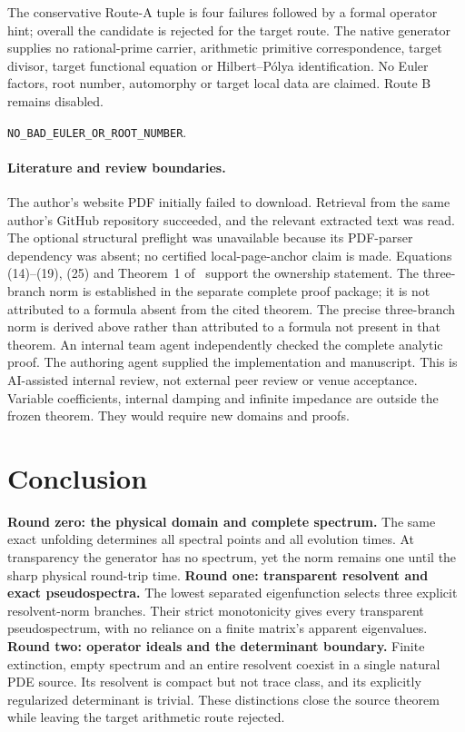 \documentclass[10pt]{article}
\begin{document}
\begin{samepage}
The conservative Route-A tuple is four failures followed by a formal
operator hint; overall the candidate is rejected for the target route.
The native generator supplies no rational-prime carrier, arithmetic
primitive correspondence, target divisor, target functional equation or
Hilbert--P\'olya identification. No Euler factors, root number, automorphy
or target local data are claimed. Route B remains disabled.
\par\noindent\texttt{NO\_BAD\_EULER\_OR\_ROOT\_NUMBER}.
\end{samepage}

\paragraph{Literature and review boundaries.}
The author's website PDF initially failed to download. Retrieval from the
same author's GitHub repository succeeded, and the relevant extracted text
was read. The optional structural preflight was unavailable because its
PDF-parser dependency was absent; no certified local-page-anchor claim is
made. Equations (14)--(19), (25) and Theorem~1 of~\cite{driscoll1996}
support the ownership statement.
\ifnum{}
The three-branch norm is established in the separate complete proof package;
it is not attributed to a formula absent from the cited theorem.
\else
The precise three-branch norm is derived above rather than attributed to a
formula not present in that theorem.
\fi
An internal team agent independently checked the complete analytic proof.
The authoring agent supplied the implementation and manuscript. This is
AI-assisted internal review, not external peer review or venue acceptance.
Variable coefficients, internal damping and infinite impedance are outside
the frozen theorem. They would require new domains and proofs.

\section{Conclusion}
\ifcase\CRevisionRound
\textbf{Round zero: the physical domain and complete spectrum.}
The same exact unfolding determines all spectral points and all evolution
times. At transparency the generator has no spectrum, yet the norm remains
one until the sharp physical round-trip time.
\or
\textbf{Round one: transparent resolvent and exact pseudospectra.}
The lowest separated eigenfunction selects three explicit resolvent-norm
branches. Their strict monotonicity gives every transparent pseudospectrum,
with no reliance on a finite matrix's apparent eigenvalues.
\else
\textbf{Round two: operator ideals and the determinant boundary.}
Finite extinction, empty spectrum and an entire resolvent coexist in a
single natural PDE source. Its resolvent is compact but not trace class,
and its explicitly regularized determinant is trivial. These distinctions
close the source theorem while leaving the target arithmetic route rejected.
\fi
\end{document}
